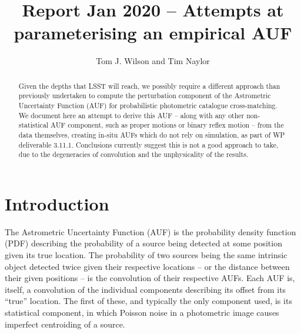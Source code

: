\documentclass[fleqn,usenatbib]{mnras}
\title[]{Report Jan 2020 – Attempts at parameterising an empirical AUF}
\author[Tom J. Wilson and Tim Naylor]{
Tom J. Wilson
and Tim Naylor
\\
}
\date{}
\begin{document}
\label{firstpage}
\pagerange{\pageref{firstpage}--\pageref{lastpage}}
\maketitle
\begin{abstract}

Given the depths that LSST will reach, we possibly require a different approach than previously undertaken to compute the perturbation component of the Astrometric Uncertainty Function (AUF) for probabilistic photometric catalogue cross-matching. We document here an attempt to derive this AUF -- along with any other non-statistical AUF component, such as proper motions or binary reflex motion -- from the data themselves, creating in-situ AUFs which do not rely on simulation, as part of WP deliverable 3.11.1. Conclusions currently suggest this is not a good approach to take, due to the degeneracies of convolution and the unphysicality of the results.

\end{abstract}



\section{Introduction}

The Astrometric Uncertainty Function (AUF) is the probability density function (PDF) describing the probability of a source being detected at some position given its true location. The probability of two sources being the same intrinsic object detected twice given their respective locations -- or the distance between their given positions -- is the convolution of their respective AUFs. Each AUF is, itself, a convolution of the individual components describing its offset from its ``true'' location. The first of these, and typically the only component used, is its statistical component, in which Poisson noise in a photometric image causes imperfect centroiding of a source.
\end{document}
